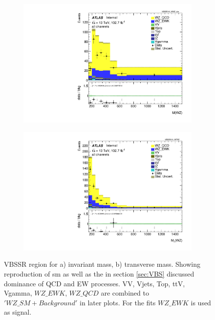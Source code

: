 \documentclass[../Bachelorarbeit.tex]{subfiles}
\begin{document}
\begin{figure}[h]
    \centering
    \begin{subfigure}{0.45\textwidth}
        \centering
        \includegraphics[width=\textwidth]{Plots/SM_reproduction/all_VV_MWZ_vbs.pdf}
        \caption{}
    \end{subfigure}
    \begin{subfigure}{0.45\textwidth}
        \centering
        \includegraphics[width=\textwidth]{Plots/SM_reproduction/all_VV_MTWZ.pdf}
        \caption{}
    \end{subfigure}
    \caption{VBSSR region for a) invariant mass, b) transverse mass. Showing reproduction of \acrshort{sm} as well as the in section \ref{sec:VBS} discussed dominance of QCD and EW processes. VV, Vjets, Top, ttV, Vgamma, $WZ\_EWK$, $WZ\_QCD$ are combined to $'WZ\_SM + Background'$ in later plots. For the fits $WZ\_EWK$ is used as signal.}
    \label{fig:SM_re}
\end{figure}
\end{document}
